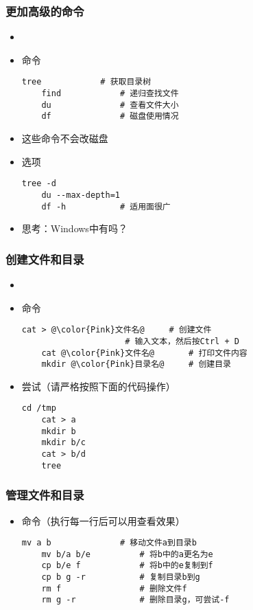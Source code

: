 \begin{frame} [fragile]
	\frametitle{更加高级的命令}
	\begin{itemize}
	\item {}
	\item 命令
	\begin{lstlisting}[style=bashstyle, gobble=4, texcl]
	tree			# 获取目录树
	find			# 递归查找文件
	du				# 查看文件大小
	df				# 磁盘使用情况
	\end{lstlisting}
	\item 这些命令不会改磁盘
	\item 选项
	\begin{lstlisting}[style=bashstyle, gobble=4, texcl]
	tree -d
	du --max-depth=1
	df -h			# 适用面很广
	\end{lstlisting}
	\item 思考：Windows中有吗？
	\end{itemize}
\end{frame}

\begin{frame} [fragile]
	\frametitle{创建文件和目录}
	\begin{itemize}
	\item {}
	\item 命令
	\begin{lstlisting}[style=bashstyle, gobble=4, texcl, escapechar=@]
	cat > @\color{Pink}文件名@		# 创建文件
					 # 输入文本，然后按Ctrl + D
	cat @\color{Pink}文件名@		# 打印文件内容
	mkdir @\color{Pink}目录名@		# 创建目录
	\end{lstlisting}
	\item 尝试（请严格按照下面的代码操作）
	\begin{lstlisting}[style=bashstyle, gobble=4, texcl]
	cd /tmp
	cat > a
	mkdir b
	mkdir b/c
	cat > b/d
	tree
	\end{lstlisting}
	\end{itemize}
\end{frame}

\begin{frame} [fragile]
	\frametitle{管理文件和目录}
	\linespread{1.25}
	\begin{itemize}
	\item 命令（执行每一行后可以用查看效果）
	\begin{lstlisting}[style=bashstyle, gobble=4, texcl]
	mv a b				# 移动文件a到目录b
	mv b/a b/e			# 将b中的a更名为e
	cp b/e f			# 将b中的e复制到f
	cp b g -r			# 复制目录b到g
	rm f				# 删除文件f
	rm g -r				# 删除目录g，可尝试-f
	\end{lstlisting}
	\end{itemize}
\end{frame}

